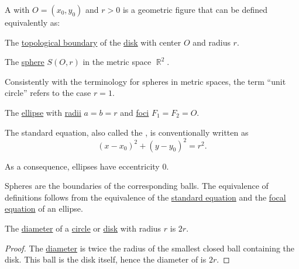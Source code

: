\begin{definition}\label{def:circle}\mimprovised
  A  with  \( O = (x_0, y_0) \) and  \( r > 0 \) is a geometric figure that can be defined equivalently as:

  \begin{thmenum}[series=def:circle]
     The \hyperref[def:topological_boundary]{topological boundary} of the \hyperref[def:disk]{disk} with center \( O \) and radius \( r \).

     The \hyperref[def:metric_space/sphere]{sphere} \( S(O, r) \) in the metric space \( \BbbR^2 \).

    Consistently with the terminology for spheres in metric spaces, the term \enquote{unit circle} refers to the case \( r = 1 \).

     The \hyperref[def:ellipse]{ellipse} with \hyperref[def:ellipse]{radii} \( a = b = r \) and \hyperref[def:ellipse/foci]{foci} \( F_1 = F_2 = O \).

    The standard equation, also called the , is conventionally written as
    \begin{equation}\label{eq:def:circle/ellipse/central_equation}
      (x - x_0)^2 + (y - y_0)^2 = r^2.
    \end{equation}

    As a consequence, ellipses have eccentricity \( 0 \).
  \end{thmenum}
\end{definition}
\begin{defproof}
   Spheres are the boundaries of the corresponding balls.
   The equivalence of definitions follows from the equivalence of the \hyperref[def:ellipse/focal_equation]{standard equation} and the \hyperref[def:ellipse/focal_equation]{focal equation} of an ellipse.
\end{defproof}

\begin{proposition}\label{thm:circle_diameter}
  The \hyperref[def:metric_space/diameter]{diameter} of a \hyperref[def:circle]{circle} or \hyperref[def:disk]{disk} with radius \( r \) is \( 2r \).
\end{proposition}
\begin{proof}
  The \hyperref[def:metric_space/diameter]{diameter} is twice the radius of the smallest closed ball containing the disk. This ball is the disk itself, hence the diameter of is \( 2r \).
\end{proof}

